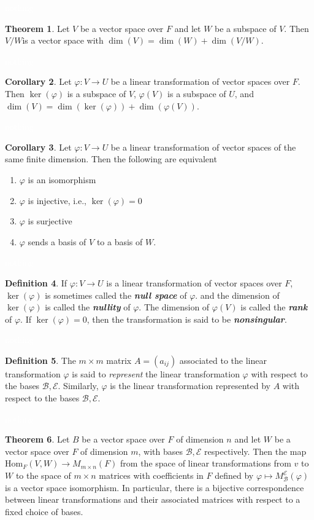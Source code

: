 \documentclass{article}
\theoremstyle{definition}
\newtheorem{thm}{Theorem}[section]
\newtheorem{cor}[thm]{Corollary}
\newtheorem{defn}[thm]{Definition}
\newcommand{\nl}{\textcolor{white}{nothing}}
\newcommand{\ra}{\rightarrow}
\newcommand{\vphi}{\varphi}
\newcommand{\Hom}{\text{Hom}}
\newcommand{\BB}{\mathcal{B}}
\newcommand{\EE}{\mathcal{E}}
\begin{document}
\nl

\begin{thm}
Let $V$ be a vector space over $F$ and let $W$ be a subspace of $V$. Then $V/W$is a vector space with $\dim(V) = \dim(W) + \dim(V/W)$.
\end{thm}

\nl

\begin{cor}
Let $\vphi:V\ra U$ be a linear transformation of vector spaces over $F$. Then $\ker(\vphi)$ is a subspace of $V$, $\vphi(V)$ is a subspace of $U$, and $\dim(V) = \dim(\ker(\vphi)) + \dim(\vphi(V))$.
\end{cor}

\nl

\begin{cor}
Let $\vphi:V\ra U$ be a linear transformation of vector spaces of the same finite dimension. Then the following are equivalent
\begin{enumerate}
\item $\vphi$ is an isomorphism
\item $\vphi$ is injective, i.e., $\ker(\vphi) = 0$
\item $\vphi$ is surjective
\item $\vphi$ sends a basis of $V$ to a basis of $W$.
\end{enumerate}
\end{cor}

\nl

\begin{defn}
If $\vphi:V\ra U$ is a linear transformation of vector spaces over $F$, $\ker(\vphi)$ is sometimes called the \textit{\textbf{null space}} of $\vphi$. and the dimension of $\ker(\vphi)$ is called the \textit{\textbf{nullity}} of $\vphi$. The dimension of $\vphi(V)$ is called the \textit{\textbf{rank}} of $\vphi$. If $\ker(\vphi) = 0$, then the transformation is said to be \textit{\textbf{nonsingular}}.
\end{defn}

\nl

\begin{defn}
The $m \times m$ matrix $A = (a_{ij})$ associated to the linear transformation $\vphi$ is said to \textit{represent} the linear transformation $\vphi$ with respect to the bases $\BB, \EE$. Similarly, $\vphi$ is the linear transformation represented by $A$ with respect to the bases $\BB, \EE$.
\end{defn}

\nl

\begin{thm}
Let $B$ be a vector space over $F$ of dimension $n$ and let $W$ be a vector space over $F$ of dimension $m$, with bases $\BB, \EE$ respectively. Then the map $\Hom_F(V, W)\ra M_{m\times n}(F)$ from the space of linear transformations from $v$ to $W$ to the space of $m\times n$ matrices with coefficients in $F$ defined by $\vphi\mapsto M_\BB^\EE(\vphi)$ is a vector space isomorphism. In particular, there is a bijective correspondence between linear transformations and their associated matrices with respect to a fixed choice of bases.
\end{thm}
\end{document}
